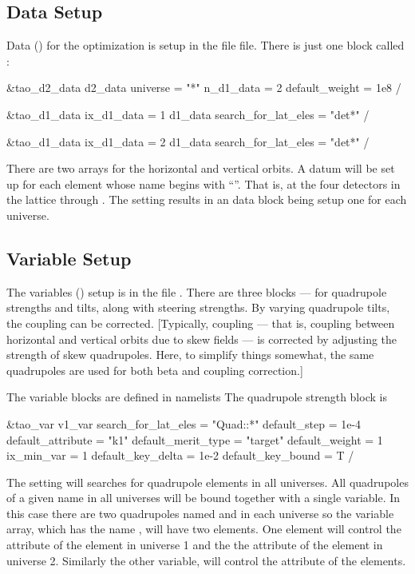 \documentclass{hitec}     %
\begin{document}
{%
\subsection{Data Setup}
\label{s:twiss.data}

Data () for the optimization is setup in the file  file. There is just one
 block called :
\begin{code}
&tao_d2_data
  d2_data%
  universe = "*"
  n_d1_data = 2
  default_weight = 1e8
/

&tao_d1_data
  ix_d1_data = 1
  d1_data%
  search_for_lat_eles = "det*"
/

&tao_d1_data
  ix_d1_data = 2
  d1_data%
  search_for_lat_eles = "det*"
/
\end{code}
There are two  arrays for the horizontal and vertical orbits. A datum will be set up for
each element whose name begins with ``''. That is, at the four detectors in the lattice
 through . The  setting results in an  data block being
setup one for each universe.

\subsection{Variable Setup}
\label{s:twiss.var}

The variables () setup is in the file . There are three 
blocks --- for quadrupole strengths and tilts, along with steering strengths. By varying quadrupole
tilts, the coupling can be corrected. [Typically, coupling --- that is, coupling between horizontal and
vertical orbits due to skew fields --- is corrected by adjusting the strength of skew quadrupoles. Here,
to simplify things somewhat, the same quadrupoles are used for both beta and coupling correction.]

The variable blocks are defined in  namelists The quadrupole strength block is
\begin{code}
&tao_var
  v1_var%
  search_for_lat_eles = "Quad::*"
  default_step = 1e-4
  default_attribute = "k1"
  default_merit_type = "target"
  default_weight = 1
  ix_min_var = 1
  default_key_delta = 1e-2
  default_key_bound = T
/
\end{code}
The  setting will searches for quadrupole elements in all universes. All
quadrupoles of a given name in all universes will be bound together with a single variable. In this
case there are two quadrupoles named  and  in each universe so the 
variable array, which has the name , will have two elements. One element will control
the  attribute of the  element in universe 1 and the the  attribute of the
 element in universe 2. Similarly the other variable,  will control the
 attribute of the  elements.

}
\end{document}
